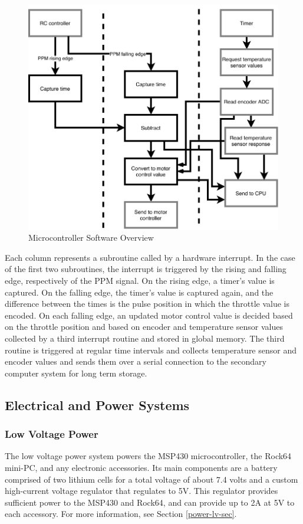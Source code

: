 \documentclass[titlepage, letterpaper,12pt]{article}
\begin{document}
\begin{figure}[!htbp]\centering
\includegraphics{mcusoftware.pdf}
\caption{Microcontroller Software Overview}
\label{mcu-sw}
\end{figure}

Each column represents a subroutine called by a hardware interrupt. In the case of the first two subroutines, the interrupt is triggered by the rising and falling edge, respectively of the PPM signal. On  the rising edge, a timer's value is captured. On the falling edge, the timer's value is captured again, and the difference between the times is the pulse position in which the throttle value is encoded. On each falling edge, an updated motor control value is decided based on the throttle position and based on encoder and temperature sensor values collected by a third interrupt routine and stored in global memory. The third routine is triggered at regular time intervals and collects temperature sensor and encoder values and sends them over a serial connection to the secondary computer system for long term storage.
\subsection{Electrical and Power Systems}
\subsubsection{Low Voltage Power}
The low voltage power system powers the MSP430 microcontroller, the Rock64 mini-PC, and any electronic accessories. Its main components are a battery comprised of two lithium cells for a total voltage of about 7.4 volts and a custom high-current voltage regulator that regulates to 5V. This regulator provides sufficient power to the MSP430 and Rock64, and can provide up to 2A at 5V to each accessory. For more information, see Section \ref{power-lv-sec}.
\end{document}

